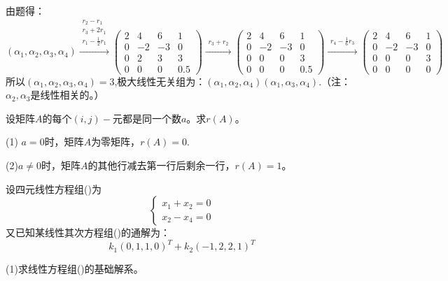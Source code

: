 \documentclass[a4paper]{report}
\begin{document}
\begin{jie}
由题得：
\begin{equation*}
(\alpha_1,\alpha_2,\alpha_3,\alpha_4)
\xrightarrow{\substack{r_{2}-r_{1}\\ r_3+2r_1\\ r_1-\frac{1}{2}r_1}}
{
\begin{pmatrix}
2&4&6&1\\
0&-2&-3&0\\
0&2&3&3\\
0&0&0&0.5
\end{pmatrix}
}\xrightarrow{\substack{r_3+r_2}}
{
\begin{pmatrix}
2&4&6&1\\
0&-2&-3&0\\
0&0&0&3\\
0&0&0&0.5
\end{pmatrix}
}\xrightarrow{\substack{r_4-\frac{1}{6}r_3}}
{
\begin{pmatrix}
2&4&6&1\\
0&-2&-3&0\\
0&0&0&3\\
0&0&0&0
\end{pmatrix}
}
\end{equation*}
所以$(\alpha_1,\alpha_2,\alpha_3,\alpha_4)=3$,极大线性无关组为：$(\alpha_1,\alpha_2,\alpha_4)(\alpha_1,\alpha_3,\alpha_4)$.（注：$\alpha_2,\alpha_3$是线性相关的。）
\end{jie}

\EX 设矩阵$A$的每个$(i,j)-$元都是同一个数$a$。求$r(A)$。

\begin{jie}
(1) $a=0$时，矩阵$A$为零矩阵，$r(A)=0$.

(2)$a\neq 0$时，矩阵$A$的其他行减去第一行后剩余一行，$r(A)=1$。
\end{jie}

\EX 设四元线性方程组(\uppercase\expandafter{})为
\begin{equation*}
\begin{cases}
x_1+x_2=0\\
x_2-x_4=0
\end{cases}
\end{equation*}
又已知某线性其次方程组(\uppercase\expandafter{})的通解为：
\begin{equation*}
k_1(0,1,1,0)^T + k_2(-1,2,2,1)^T
\end{equation*}

(1)求线性方程组(\uppercase\expandafter{})的基础解系。
\end{document}
